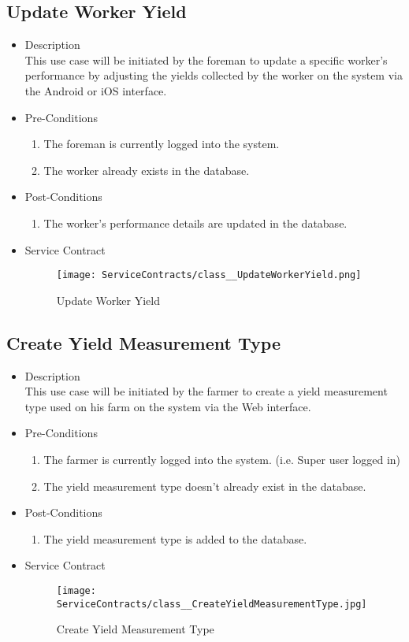 \documentclass[11pt,fleqn]{book} %
\begin{document}
\subsection{Update Worker Yield}
\begin{itemize}
	\item Description\\
	This use case will be initiated by the foreman to update a specific worker’s performance by adjusting the yields collected by the worker on the system via the Android or iOS interface.
	\item Pre-Conditions
	\begin{enumerate}
		\item The foreman is currently logged into the system.
		\item The worker already exists in the database.			
	\end{enumerate}
	\item Post-Conditions
	\begin{enumerate}
		\item The worker’s performance details are updated in the database.
	\end{enumerate}
	\item Service Contract
	\begin{figure}
		\texttt{[image: ServiceContracts/class\_\_UpdateWorkerYield.png]}
		\caption{Update Worker Yield}
	\end{figure}
\end{itemize}

\subsection{Create Yield Measurement Type}
\begin{itemize}
	\item Description\\
	This use case will be initiated by the farmer to create a yield measurement type used on his farm on the system via the Web interface.
	\item Pre-Conditions
	\begin{enumerate}
		\item The farmer is currently logged into the system. (i.e. Super user logged in)
		\item The yield measurement type doesn’t already exist in the database. 				
	\end{enumerate}
	\item Post-Conditions
	\begin{enumerate}
		\item The yield measurement type is added to the database.
	\end{enumerate}
	\item Service Contract
	\begin{figure}
		\texttt{[image: ServiceContracts/class\_\_CreateYieldMeasurementType.jpg]}
		\caption{Create Yield Measurement Type}
	\end{figure}
\end{itemize}
\end{document}
